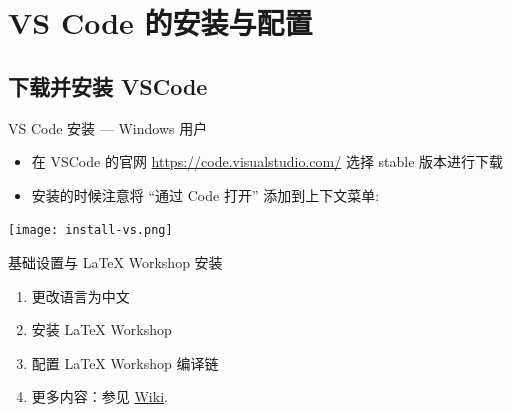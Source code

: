 \section{VS Code 的安装与配置}
\subsection{下载并安装 VSCode}
\begin{frame}[fragile]{VS Code 安装 --- Windows 用户}
  \begin{itemize}
    \item 在 VSCode 的官网 \href{https://code.visualstudio.com/}{https://code.visualstudio.com/} 选择 stable 版本进行下载
    \item 安装的时候注意将 ``通过 Code 打开'' 添加到上下文菜单:
  \end{itemize}

  \begin{center}
    \texttt{[image: install-vs.png]}
  \end{center}

\end{frame}

\begin{frame}{基础设置与 LaTeX Workshop 安装}
  \begin{enumerate}
    \item 更改语言为中文
    \item 安装 LaTeX Workshop
    \item 配置 LaTeX Workshop 编译链
    \item 更多内容：参见 \href{https://gitee.com/xkwxdyy/CCNUthesis/wikis/\%E5\%B8\%B8\%E8\%A7\%81\%E9\%97\%AE\%E9\%A2\%98FAQ/\%E5\%A6\%82\%E4\%BD\%95\%E5\%AE\%89\%E8\%A3\%85\%E3\%80\%81\%E9\%85\%8D\%E7\%BD\%AE\%E5\%92\%8C\%E4\%BD\%BF\%E7\%94\%A8VScode\#config-LW}{Wiki}. 
  \end{enumerate}
\end{frame}